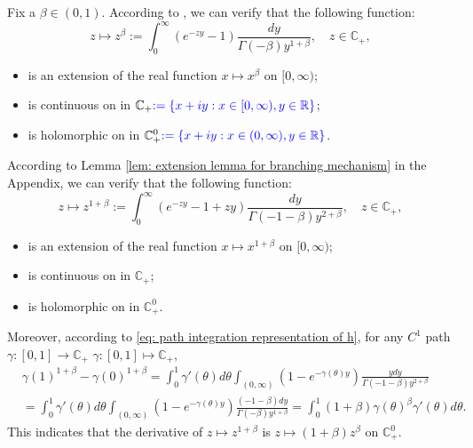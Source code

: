 \documentclass[12pt,oneside,english]{amsart}
\theoremstyle{plain}
\theoremstyle{definition}
\numberwithin{equation}{section}
\newcommand{\added}[1]{{\color{blue}#1}}\newcommand{\deleted}[1]{{\color{red}#1}}
\begin{document}
    Fix a $\beta \in (0,1)$.
    According to \cite[Theorem 3.2. \& Theorem 3.5.]{SchillingSongVondracek2010Bernstein}, we can verify that the following function:
\begin{equation}
    z
    \mapsto z^{\beta}
    := \int_0^\infty (e^{-zy}-1) \frac{dy}{\Gamma(-\beta)y^{1+\beta}},
    \quad z\in \mathbb C_+,
\end{equation}
\begin{itemize}
\item
    is an extension of the real function $x\mapsto x^{\beta}$ on $[0,\infty)$;
\item
    is continuous \added{ on }\deleted{ in} $\mathbb C_+\added{ :=\{x+iy: x\in [0,\infty), y\in \mathbb R\}}$;
\item
    is holomorphic \added{ on }\deleted{ in} $\mathbb C_+^0\added{ := \{x+iy:x\in (0,\infty), y\in \mathbb R\}}$.
\end{itemize}
    According to Lemma \ref{lem: extension lemma for branching mechanism} in the Appendix, we can verify that the following function:
\begin{equation}
\label{eq: stable branching on C+}
    z\mapsto
    z^{1+\beta}
    := \int_0^\infty (e^{-zy}-1+zy)\frac{dy}{\Gamma(-1-\beta)y^{2+\beta}},
    \quad z\in \mathbb C_+,
\end{equation}
\begin{itemize}
\item
    is an extension of the real function $x\mapsto x^{1+\beta}$ on $[0,\infty)$;
\item
    is continuous \added{ on }\deleted{ in} $\mathbb C_+$;
\item
    is holomorphic \added{ on }\deleted{ in} $\mathbb C_+^0$.
\end{itemize}
    Moreover, according to \eqref{eq: path integration representation of h}, for any $C^1$ path \added{ $\gamma:[0,1]\to \mathbb C_+$ }\deleted{ $\gamma:[0,1]\mapsto \mathbb C_+$},
\begin{align}
\label{eq: integration formula for 1+beta-th power of z}
    &\gamma(1)^{1+\beta} - \gamma(0)^{1+\beta}
    = \int_0^1 \gamma'(\theta)d\theta \int_{(0,\infty)}(1-e^{-\gamma(\theta)y})\frac{ydy}{\Gamma(-1-\beta)y^{2+\beta}}
    \\&=\int_0^1 \gamma'(\theta)d\theta \int_{(0,\infty)}(1-e^{-\gamma(\theta)y})\frac{(-1-\beta)dy}{\Gamma(-\beta)y^{1+\beta}}
    = \int_0^1 (1+\beta) \gamma(\theta)^{\beta} \gamma'(\theta)d\theta.
\end{align}
    This indicates that the derivative of $z\mapsto z^{1+\beta}$ is $z\mapsto (1+\beta)z^{\beta}$ on $\mathbb C^0_+$.
\end{document}
